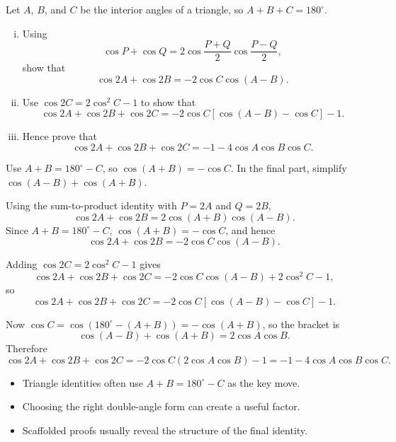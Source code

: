 \begin{problem}
Let $A$, $B$, and $C$ be the interior angles of a triangle, so
$A+B+C=180^\circ$.

\begin{enumerate}[(i)]
  \item Using
  \[
  \cos P+\cos Q
  =2\cos\frac{P+Q}{2}\cos\frac{P-Q}{2},
  \]
  show that
  \[
  \cos2A+\cos2B=-2\cos C\cos(A-B).
  \]
  \item Use $\cos2C=2\cos^2C-1$ to show that
  \[
  \cos2A+\cos2B+\cos2C
  =
  -2\cos C[\cos(A-B)-\cos C]-1.
  \]
  \item Hence prove that
  \[
  \cos2A+\cos2B+\cos2C
  =
  -1-4\cos A\cos B\cos C.
  \]
\end{enumerate}
\end{problem}

\begin{hintbox}
Use $A+B=180^\circ-C$, so $\cos(A+B)=-\cos C$. In the final part, simplify
$\cos(A-B)+\cos(A+B)$.
\end{hintbox}

\begin{solution}
Using the sum-to-product identity with $P=2A$ and $Q=2B$,
\[
\cos2A+\cos2B=2\cos(A+B)\cos(A-B).
\]
Since $A+B=180^\circ-C$, $\cos(A+B)=-\cos C$, and hence
\[
\cos2A+\cos2B=-2\cos C\cos(A-B).
\]

Adding $\cos2C=2\cos^2C-1$ gives
\[
\cos2A+\cos2B+\cos2C
=-2\cos C\cos(A-B)+2\cos^2C-1,
\]
so
\[
\cos2A+\cos2B+\cos2C
=-2\cos C[\cos(A-B)-\cos C]-1.
\]

Now $\cos C=\cos(180^\circ-(A+B))=-\cos(A+B)$, so the bracket is
\[
\cos(A-B)+\cos(A+B)=2\cos A\cos B.
\]
Therefore
\[
\cos2A+\cos2B+\cos2C
=-2\cos C(2\cos A\cos B)-1
=-1-4\cos A\cos B\cos C.
\]
\end{solution}

\begin{takeaways}
\begin{itemize}[leftmargin=*]
  \item Triangle identities often use $A+B=180^\circ-C$ as the key move.
  \item Choosing the right double-angle form can create a useful factor.
  \item Scaffolded proofs usually reveal the structure of the final identity.
\end{itemize}
\end{takeaways}

